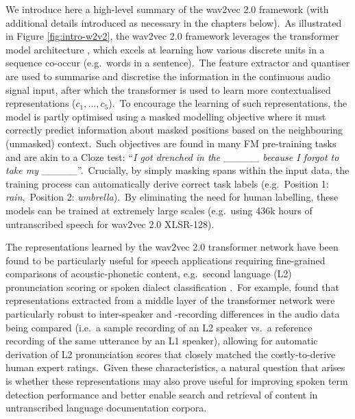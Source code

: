 \documentclass[main.tex]{subfiles}
\begin{document}
We introduce here a high-level summary of the wav2vec 2.0 framework (with additional details introduced as necessary in the chapters below).~As illustrated in Figure \ref{fig:intro-w2v2}, the wav2vec 2.0 framework leverages the transformer model architecture \parencite{vaswani2017attention}, which excels at learning how various discrete units in a sequence co-occur (e.g.~words in a sentence).~The feature extractor and quantiser are used to summarise and discretise the information in the continuous audio signal input, after which the transformer is used to learn more contextualised representations ($c_1, ..., c_5$).~To encourage the learning of such representations, the model is partly optimised using a masked modelling objective where it must correctly predict information about masked positions based on the neighbouring (unmasked) context.~Such objectives are found in many FM pre-training tasks and are akin to a Cloze test: ``\emph{I got drenched in the \_\_\_\_\_ because I forgot to take my \_\_\_\_\_}''.~Crucially, by simply masking spans within the input data, the training process can automatically derive correct task labels (e.g.~Position 1: \emph{rain},~Position 2: \emph{umbrella}).~By eliminating the need for human labelling, these models can be trained at extremely large scales (e.g.~using 436k hours of untranscribed speech for wav2vec 2.0 XLSR-128).

The representations learned by the wav2vec 2.0 transformer network have been found to be particularly useful for speech applications requiring fine-grained comparisons of acoustic-phonetic content, e.g.~second language (L2) pronunciation scoring \parencite{bartelds2022neural,richter2023relative} or spoken dialect classification \parencite{bartelds2022quantifying,guillaume23_sigul}.~For example, \textcite{bartelds2022neural} found that representations extracted from a middle layer of the transformer network were particularly robust to inter-speaker and -recording differences in the audio data being compared (i.e.~a sample recording of an L2 speaker vs.~a reference recording of the same utterance by an L1 speaker), allowing for automatic derivation of L2 pronunciation scores that closely matched the costly-to-derive human expert ratings.~Given these characteristics, a natural question that arises is whether these representations may also prove useful for improving spoken term detection performance and better enable search and retrieval of content in untranscribed language documentation corpora.
\end{document}
